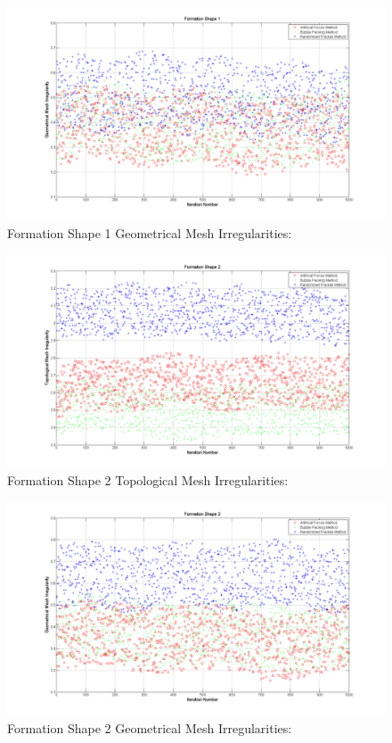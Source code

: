 \begin{figure}[H]
\caption{Formation Shape 1 Geometrical Mesh Irregularities:} \label{geometric_ref_1}
\centerline{\includegraphics[scale = 0.40]{Geometrical_Irr_1}}
\end{figure} 	

\begin{figure}[H]
\caption{Formation Shape 2 Topological Mesh Irregularities:} \label{topologic_ref_2}
\centerline{\includegraphics[scale = 0.40]{Topological_Irr_2}}
\end{figure} 	
				
\begin{figure}[H]
\caption{Formation Shape 2 Geometrical Mesh Irregularities:} \label{geometric_ref_2}
\centerline{\includegraphics[scale = 0.40]{Geometrical_Irr_2}}
\end{figure} 	
		
